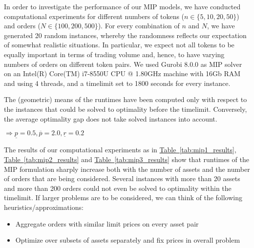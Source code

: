 \documentclass[11pt,parskip=full]{scrartcl}%
\newcommand*{\wrt}{with respect to }
\newcommand*{\tabref}[1]{\hyperref[{#1}]{Table~\ref*{#1}}}
\begin{document}
In order to investigate the performance of our MIP models, we have conducted computational
experiments for different numbers of tokens ($ n \in \{5,10,20,50\} $) and orders ($ N \in
\{100,200,500\} $).
For every combination of $ n $ and $ N $, we have generated 20 random instances, whereby the
randomness reflects our expectation of somewhat realistic situations.
In particular, we expect not all tokens to be equally important in terms of trading volume and,
hence, to have varying numbers of orders on different token pairs.
We used Gurobi 8.0.0 as MIP solver on an Intel(R) Core(TM) i7-8550U CPU @ 1.80GHz machine with 16Gb
RAM and using 4 threads, and a timelimit set to 1800 seconds for every instance.

The (geometric) means of the runtimes have been computed only \wrt the instances that could be
solved to optimality before the timelimit. Conversely, the average optimality gap does not take
solved instances into account.

$ \Rightarrow \underline{p}=0.5, \overline{p}=2.0, \underline{r}=0.2 $

\vspace{-5mm}
The results of our computational experiments as in \tabref{tab:mip1_results},
\tabref{tab:mip2_results} and \tabref{tab:mip3_results} show that runtimes of the MIP formulation
sharply increase both with the number of assets and the number of orders that are being considered.
Several instances with more than 20 assets and more than 200 orders could not even be solved to
optimality within the timelimit.
If larger problems are to be considered, we can think of the following heuristics/approximations:
\begin{itemize}
    \item Aggregate orders with similar limit prices on every asset pair
    \item Optimize over subsets of assets separately and fix prices in overall problem
\end{itemize}
\end{document}
